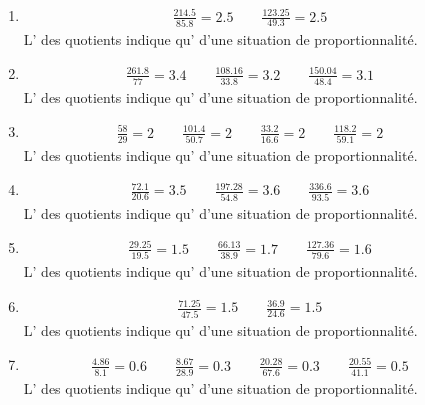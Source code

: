 {\begin{enumerate}
\item\begin{align*}
\frac{214.5}{85.8} = 2.5\qquad \frac{123.25}{49.3} = 2.5\qquad 
\end{align*}
L' des quotients indique qu' d'une situation de proportionnalité.

\item\begin{align*}
\frac{261.8}{77} = 3.4\qquad \frac{108.16}{33.8} = 3.2\qquad \frac{150.04}{48.4} = 3.1\qquad 
\end{align*}
L' des quotients indique qu' d'une situation de proportionnalité.

\item\begin{align*}
\frac{58}{29} = 2\qquad \frac{101.4}{50.7} = 2\qquad \frac{33.2}{16.6} = 2\qquad \frac{118.2}{59.1} = 2\qquad 
\end{align*}
L' des quotients indique qu' d'une situation de proportionnalité.

\item\begin{align*}
\frac{72.1}{20.6} = 3.5\qquad \frac{197.28}{54.8} = 3.6\qquad \frac{336.6}{93.5} = 3.6\qquad 
\end{align*}
L' des quotients indique qu' d'une situation de proportionnalité.

\item\begin{align*}
\frac{29.25}{19.5} = 1.5\qquad \frac{66.13}{38.9} = 1.7\qquad \frac{127.36}{79.6} = 1.6\qquad 
\end{align*}
L' des quotients indique qu' d'une situation de proportionnalité.

\item\begin{align*}
\frac{71.25}{47.5} = 1.5\qquad \frac{36.9}{24.6} = 1.5\qquad 
\end{align*}
L' des quotients indique qu' d'une situation de proportionnalité.

\item\begin{align*}
\frac{4.86}{8.1} = 0.6\qquad \frac{8.67}{28.9} = 0.3\qquad \frac{20.28}{67.6} = 0.3\qquad \frac{20.55}{41.1} = 0.5\qquad 
\end{align*}
L' des quotients indique qu' d'une situation de proportionnalité.


\end{enumerate}}

